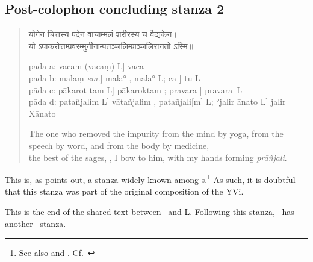 \subsection{Post-colophon concluding stanza 2}
\begin{verse}
{\dn योगेन चित्तस्य पदेन वाचाम्मलं शरीरस्य च वैद्यकेन।\\
यो ऽपाकरोत्तम्प्रवरम्मुनीनाम्पतञ्जलिम्प्राञ्जलिरानतो ऽस्मि॥} %

{\footnotesize 
pāda a: vācām \Tmpc (vācāṃ) L] vācā \Tmac\\
pāda b: malaṃ \emph{em.}]  mala° \Tm, malā° L; ca \Tm] tu L\\
pāda c: pākarot tam \Tmpc L] pākaroktam \Tmac; pravara \Tm\Lac] pra\ccs vara\cce\ L \\
pāda d: patañjalim L] \ccs v\cce ātañjalim \Tm, patañjali[m] L; °jalir ānato \Tmpc L] jalir \ccs X\cce ānato \Tm

}
The one who removed the impurity from the mind by yoga, from the speech by word, and from the body by medicine, \\
the best of the sages, \Patanjali, I bow to him, with my hands forming \emph{prāñjali}.
\end{verse}
This is, as \citet[(22)]{endoh:notes} points out, a stanza widely known among s.\footnote{See also \citet[xiv]{woods:hos} and \citet[503]{mbh1}. Cf.\ \citet[141--4]{meulenbeld:himia}} As such, it is doubtful that  this stanza was part of the original composition of the YVi.

This is the end of the shared text between \Tm\ and L\@. Following this stanza, \Tm\ has another \colophon\ stanza.


